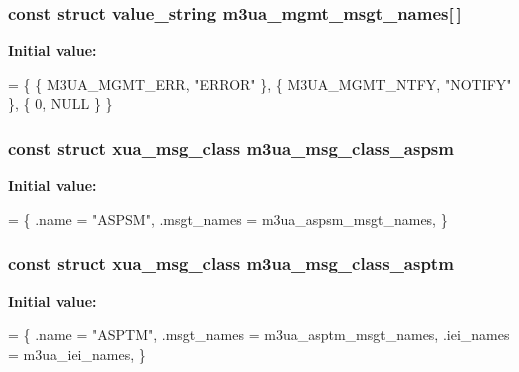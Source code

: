 \subsubsection[{m3ua\+\_\+mgmt\+\_\+msgt\+\_\+names}]{\setlength{\rightskip}{0pt plus 5cm}const struct value\+\_\+string m3ua\+\_\+mgmt\+\_\+msgt\+\_\+names[$\,$]\hspace{0.3cm}{\ttfamily [static]}}\label{m3ua_8c_a9004127a1d3b1fa30a42bd539f4299fc}
{\bfseries Initial value\+:}
\begin{DoxyCode}
= \{
        \{ M3UA_MGMT_ERR,        \textcolor{stringliteral}{"ERROR"} \},
        \{ M3UA_MGMT_NTFY,       \textcolor{stringliteral}{"NOTIFY"} \},
        \{ 0, NULL \}
\}
\end{DoxyCode}
\subsubsection[{m3ua\+\_\+msg\+\_\+class\+\_\+aspsm}]{\setlength{\rightskip}{0pt plus 5cm}const struct {\bf xua\+\_\+msg\+\_\+class} m3ua\+\_\+msg\+\_\+class\+\_\+aspsm}\label{m3ua_8c_aa105aa577d0ecdda428b9352405069ae}
{\bfseries Initial value\+:}
\begin{DoxyCode}
= \{
        .name = \textcolor{stringliteral}{"ASPSM"},
        .msgt\_names = m3ua_aspsm_msgt_names,
\}
\end{DoxyCode}
\subsubsection[{m3ua\+\_\+msg\+\_\+class\+\_\+asptm}]{\setlength{\rightskip}{0pt plus 5cm}const struct {\bf xua\+\_\+msg\+\_\+class} m3ua\+\_\+msg\+\_\+class\+\_\+asptm}\label{m3ua_8c_aa223b2feb9001b4e618842ba7f9fe530}
{\bfseries Initial value\+:}
\begin{DoxyCode}
= \{
        .name = \textcolor{stringliteral}{"ASPTM"},
        .msgt\_names = m3ua_asptm_msgt_names,
        .iei\_names = m3ua_iei_names,
\}
\end{DoxyCode}
